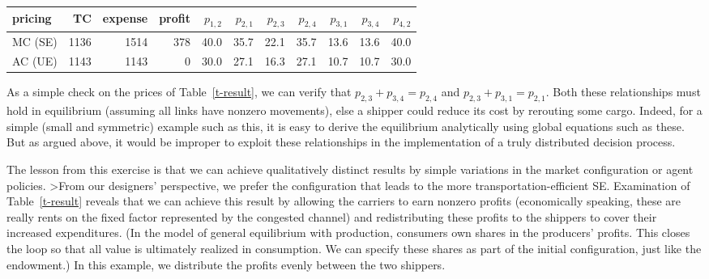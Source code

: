 \begin{table*}[htbp]
\begin{center}
\begin{tabular}{l|rrr|rrrrrrr}
pricing & TC & expense & profit & $p_{1,2}$ & $p_{2,1}$ & 
$p_{2,3}$ & $p_{2,4}$ & $p_{3,1}$ & $p_{3,4}$ & $p_{4,2}$\\\hline
MC (SE) & 1136 & 1514 & 378 & 40.0 & 35.7 & 22.1 & 35.7 & 
13.6 & 13.6 & 40.0 \\
AC (UE) & 1143 & 1143 & 0 & 30.0 & 27.1 & 16.3 & 27.1 & 
10.7 & 10.7 & 30.0 \\
\end{tabular}
\end{center}
\caption{Equilibria derived by {\sc walras} for the transportation example.
TC, MC, and AC stand for total, marginal, and average cost, respectively.
$\mbox{TC} = \mbox{shipper expense} - \mbox{carrier profit}$.}
\label{t-result}
\end{table*}

As a simple check on the prices of Table~\ref{t-result}, we can verify
that $p_{2,3}+p_{3,4}=p_{2,4}$ and 
$p_{2,3}+p_{3,1}=p_{2,1}$.  Both these relationships must hold in 
equilibrium (assuming all links have nonzero movements), else a shipper 
could reduce its cost by rerouting some cargo.  Indeed, for a simple 
(small and symmetric) example such as this, it is easy to derive the 
equilibrium analytically using global equations such as these.  But as argued 
above, it would be improper to exploit these relationships in the 
implementation of a truly distributed decision process.

The lesson from this exercise is that we can achieve
qualitatively distinct results by simple variations in the market 
configuration or agent policies.
>From our designers' perspective, we prefer the configuration that leads 
to the more transportation-efficient SE\@.
Examination of Table~\ref{t-result} reveals that we can achieve this 
result by allowing the carriers to earn nonzero profits (economically 
speaking, these are really rents on the fixed factor represented by the 
congested channel) and redistributing these profits to the shippers
to cover their increased expenditures.  (In the model of general 
equilibrium with production, consumers own shares in the producers' 
profits.  This closes the loop so that all value is 
ultimately realized in consumption.
We can specify these shares as part of the initial configuration, just 
like the endowment.)  In this example, we distribute the profits evenly
between the two shippers.

